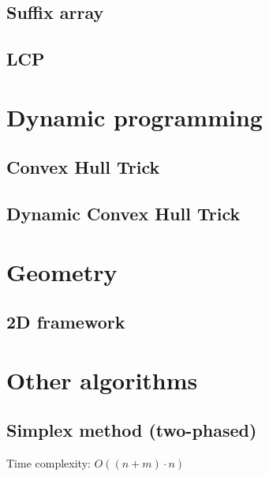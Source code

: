 \documentclass[12pt]{article}
\begin{document}
\subsection{Suffix array}
\subsection{LCP}

\section{Dynamic programming}
\subsection{Convex Hull Trick}

\subsection{Dynamic Convex Hull Trick}


\section{Geometry}
\subsection{2D framework}


\section{Other algorithms}
\subsection{Simplex method (two-phased)}
Time complexity: $O((n + m) \cdot n)$

\end{document}
